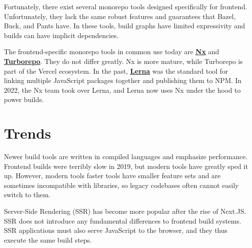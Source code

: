 \documentclass{article}
\begin{document}
Fortunately, there exist several monorepo tools designed specifically for frontend. Unfortunately,
they lack the same robust features and guarantees that Bazel, Buck, and Pants have. In these tools,
build graphs have limited expressivity and builds can have implicit dependencies.

The frontend-specific monorepo tools in common use today are \href{https://nx.dev/}{\textbf{Nx}} and
\href{https://turbo.build/repo}{\textbf{Turborepo}}. They do not differ greatly. Nx is more mature,
while Turborepo is part of the Vercel ecosystem. In the past,
\href{https://lerna.js.org/}{\textbf{Lerna}} was the standard tool for linking multiple JavaScript
packages together and publishing them to NPM. In 2022, the Nx team took over Lerna, and Lerna now
uses Nx under the hood to power builds.

\section{Trends}

Newer build tools are written in compiled languages and emphasize performance. Frontend builds were
terribly slow in 2019, but modern tools have greatly sped it up. However, modern tools faster tools
have smaller feature sets and are sometimes incompatible with libraries, so legacy codebases often
cannot easily switch to them.

Server-Side Rendering (SSR) has become more popular after the rise of Next.JS. SSR does not
introduce any fundamental differences to frontend build systems. SSR applications must also serve
JavaScript to the browser, and they thus execute the same build steps.
\end{document}
